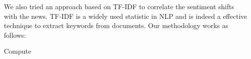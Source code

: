 We also tried an approach based on TF-IDF to correlate the sentiment shifts with the news. TF-IDF is a widely used statistic in NLP and is indeed a effective technique to extract keywords from documents. Our methodology works as follows:
\begin{algorithmic}
\STATE Compute
\ENDFOR

\end{algorithmic}